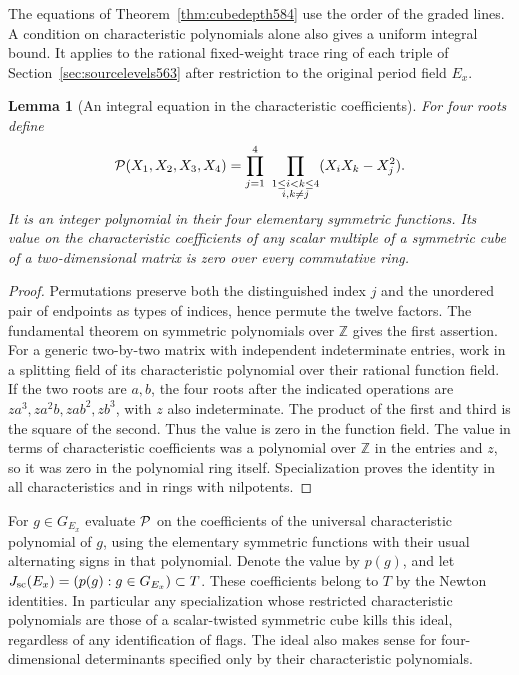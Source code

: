 \documentclass[a4paper,11pt]{article}
\newtheorem{lemma}[proposition]{Lemma}
\theoremstyle{definition}
\theoremstyle{remark}
\newcommand{\ZZ}{\mathbb Z}\newcommand{\ord}{\operatorname{ord}}
\numberwithin{equation}{section}
\begin{document}
The equations of Theorem~\ref{thm:cubedepth584} use the
order of the graded lines. A condition on characteristic
polynomials alone also gives a uniform integral bound. It
applies to the rational fixed-weight trace ring of each triple
of Section~\ref{sec:sourcelevels563} after restriction to
the original period field \(E_x\).

\begin{lemma}[An integral equation in the characteristic coefficients]
\leavevmode\label{lem:unorderedcube588}
For four roots define
\[
 {\cal P}(X_1,X_2,X_3,X_4)=
 \prod_{j=1}^4\ 
 \prod_{\substack{1\le i<k\le4\\i,k\ne j}}
                          (X_iX_k-X_j^2).
\]
It is an integer polynomial in their four elementary symmetric
functions. Its value on the characteristic coefficients of any
scalar multiple of a symmetric cube of a two-dimensional
matrix is zero over every commutative ring.
\end{lemma}
\begin{proof}
Permutations preserve both the distinguished index \(j\) and
the unordered pair of endpoints as types of indices, hence
permute the twelve factors. The fundamental theorem on
symmetric polynomials over \(\ZZ\) gives the first assertion.
For a generic two-by-two matrix with independent indeterminate
entries, work in a splitting field of its characteristic
polynomial over their rational function field. If the two
roots are \(a,b\), the four roots after the indicated
operations are \(z a^3,z a^2b,z ab^2,z b^3\), with \(z\)
also indeterminate. The product of the first and third is
the square of the second. Thus the value is zero in the
function field. The value in terms of characteristic
coefficients was a polynomial over \(\ZZ\) in the entries
and \(z\), so it was zero in the polynomial ring itself.
Specialization proves the identity in all characteristics
and in rings with nilpotents.
\end{proof}

For \(g\in G_{E_x}\) evaluate \({\cal P}\) on the coefficients
of the universal characteristic polynomial of \(g\), using
the elementary symmetric functions with their usual alternating
signs in that polynomial. Denote the value by \(p(g)\), and
let \(J_{\rm sc}(E_x)=(p(g):g\in G_{E_x})\subset T\).
These coefficients belong to \(T\) by the Newton identities.
In particular any specialization whose restricted characteristic
polynomials are those of a scalar-twisted symmetric cube kills
this ideal, regardless of any identification of flags. The ideal
also makes sense for four-dimensional determinants specified
only by their characteristic polynomials.
\end{document}
